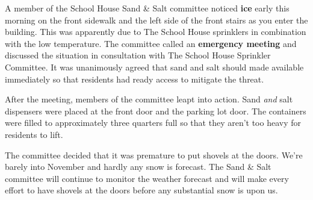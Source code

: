 \documentclass[letterpaper,12pt]{texMemo}
\begin{document}
\maketitle

A member of the School House Sand \& Salt committee noticed
\textbf{ice} early this morning on the front sidewalk and the left
side of the front stairs as you enter the building. This was
apparently due to The School House sprinklers in combination with the
low temperature. The committee called an \textbf{emergency meeting}
and discussed the situation in consultation with The School House Sprinkler Committee. It was unanimously agreed that sand and
salt should made available immediately so that residents had ready
access to mitigate the threat.

After the meeting, members of the committee leapt into action. Sand
\emph{and} salt dispensers were placed at the front door and the
parking lot door. The containers were filled to approximately three
quarters full so that they aren't too heavy for residents to lift.

The committee decided that it was premature to put shovels at the
doors. We're barely into November and hardly any snow is forecast. The
Sand \& Salt committee will continue to monitor the weather forecast
and will make every effort to have shovels at the doors before any
substantial snow is upon us.
\end{document}
